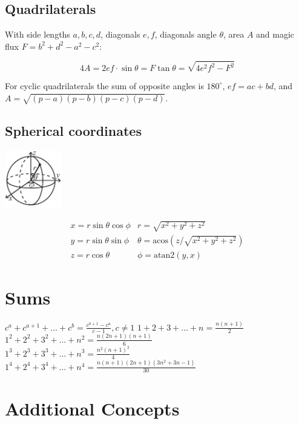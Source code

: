 \subsection{Quadrilaterals}
With side lengths $a,b,c,d$, diagonals $e, f$, diagonals angle $\theta$, area $A$ and
magic flux $F=b^2+d^2-a^2-c^2$:

\[ 4A = 2ef \cdot \sin\theta = F\tan\theta = \sqrt{4e^2f^2-F^2} \]

 For cyclic quadrilaterals the sum of opposite angles is $180^\circ$,
$ef = ac + bd$, and $A = \sqrt{(p-a)(p-b)(p-c)(p-d)}$.

\subsection{Spherical coordinates}
\begin{center}
\includegraphics[width=25mm]{content/math/sphericalCoordinates}
\end{center}
\[\begin{array}{cc}
x = r\sin\theta\cos\phi & r = \sqrt{x^2+y^2+z^2}\\
y = r\sin\theta\sin\phi & \theta = \textrm{acos}(z/\sqrt{x^2+y^2+z^2})\\
z = r\cos\theta & \phi = \textrm{atan2}(y,x)
\end{array}\]

\section{Sums}
$c^a + c^{a+1} + \dots + c^{b} = \frac{c^{b+1} - c^a}{c-1}, c \neq 1$
$1 + 2 + 3 + \dots + n = \frac{n(n+1)}{2}$ \\
$1^2 + 2^2 + 3^2 + \dots + n^2 = \frac{n(2n+1)(n+1)}{6}$\\
$1^3 + 2^3 + 3^3 + \dots + n^3 = \frac{n^2(n+1)^2}{4}$ \\
$1^4 + 2^4 + 3^4 + \dots + n^4 = \frac{n(n+1)(2n+1)(3n^2 + 3n - 1)}{30}$ \\

\section{Additional Concepts}

